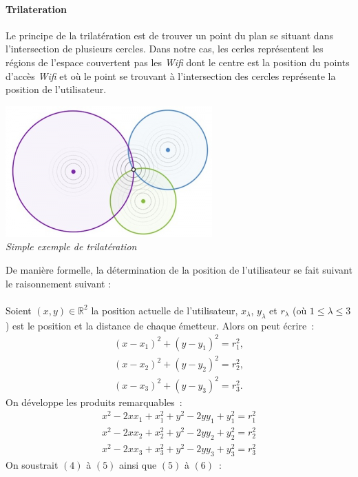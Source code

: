 \documentclass[11pt,a4paper]{article}
\begin{document}
    \paragraph{Trilateration}
      Le principe de la trilatération est de trouver un point du plan se situant dans l'intersection de plusieurs cercles. Dans notre cas, les cerles représentent les régions de l'espace couvertent pas les \textit{Wifi} dont le centre est la position du points d'accès \textit{Wifi} et où le point se trouvant à l'intersection des cercles représente la position de l'utilisateur.
      \begin{center}
        \includegraphics[scale=0.8]{trilateration.png}\\
        \textit{Simple exemple de trilatération}
      \end{center}
      De manière formelle, la détermination de la position de l'utilisateur se fait suivant le raisonnement suivant :\\\\
      Soient $(x, y) \in \mathbb R^2$ la position actuelle de l'utilisateur, $x_{\lambda}$, $y_{\lambda}$ et $r_{\lambda}$ (où $1 \leq \lambda \leq 3$) est le position et la distance de chaque
	  émetteur. Alors on peut écrire~:
      \begin{align}
        (x-x_{1})^{2}+(y-y_{1})^{2} = r_{1}^{2}, \\
        (x-x_{2})^{2}+(y-y_{2})^{2} = r_{2}^{2}, \\
        (x-x_{3})^{2}+(y-y_{3})^{2} = r_{3}^{2}.
      \end{align}
      On développe les produits remarquables~:
      \begin{align}
        x^{2}-2xx_{1}+x_{1}^{2}+y^{2}-2yy_{1}+y_{1}^{2} = r_{1}^{2} \\
        x^{2}-2xx_{2}+x_{2}^{2}+y^{2}-2yy_{2}+y_{2}^{2} = r_{2}^{2} \\
        x^{2}-2xx_{3}+x_{3}^{2}+y^{2}-2yy_{3}+y_{3}^{2} = r_{3}^{2}
      \end{align}
      On soustrait $(4)$ à $(5)$ ainsi que $(5)$ à $(6)$~:
\end{document}
